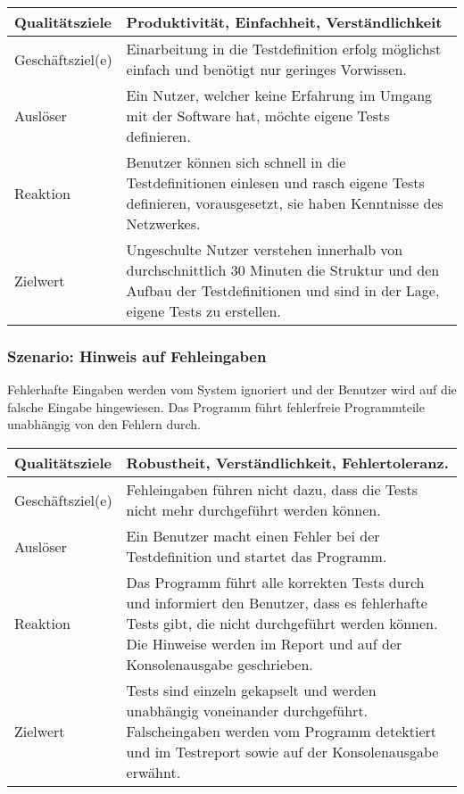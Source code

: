 \documentclass[
	ngerman,
	toc=listof, %
	toc=bibliography, %
	footnotes=multiple, %
	parskip=half, %
	numbers=noendperiod %
]{scrartcl}
\begin{document}
			\begin{tabularx}{\textwidth}{lX}
				\toprule
				Qualitätsziele & Produktivität, Einfachheit, Verständlichkeit \\
				\midrule
				Geschäftsziel(e) & Einarbeitung in die Testdefinition erfolg möglichst einfach und benötigt nur geringes Vorwissen.  \\
				\midrule
				Auslöser & Ein Nutzer, welcher keine Erfahrung im Umgang mit der Software hat, möchte eigene Tests definieren.  \\
				\midrule
				Reaktion & Benutzer können sich schnell in die Testdefinitionen einlesen und rasch eigene Tests definieren, vorausgesetzt, sie haben Kenntnisse des Netzwerkes.  \\
				\midrule
				Zielwert & Ungeschulte Nutzer verstehen innerhalb von durchschnittlich 30 Minuten die Struktur und den Aufbau der Testdefinitionen und sind in der Lage, eigene Tests zu erstellen.  \\
				\bottomrule
			\end{tabularx}
			
		\subsubsection{Szenario: Hinweis auf Fehleingaben}
		Fehlerhafte Eingaben werden vom System ignoriert und der Benutzer wird auf die falsche Eingabe hingewiesen. Das Programm führt fehlerfreie Programmteile unabhängig von den Fehlern durch.
			
		\begin{tabularx}{\textwidth}{lX}
			\toprule
			Qualitätsziele & Robustheit, Verständlichkeit, Fehlertoleranz.  \\
			\midrule
			Geschäftsziel(e) & Fehleingaben führen nicht dazu, dass die Tests nicht mehr durchgeführt werden können.  \\
			\midrule
			Auslöser & Ein Benutzer macht einen Fehler bei der Testdefinition und startet das Programm.  \\
			\midrule
			Reaktion & Das Programm führt alle korrekten Tests durch und informiert den Benutzer, dass es fehlerhafte Tests gibt, die nicht durchgeführt werden können. Die Hinweise werden im Report und auf der Konsolenausgabe geschrieben.   \\
			\midrule
			Zielwert & Tests sind einzeln gekapselt und werden unabhängig voneinander durchgeführt. Falscheingaben werden vom Programm detektiert und im Testreport sowie auf der Konsolenausgabe erwähnt.  \\
			\bottomrule
		\end{tabularx}
		
\end{document}
